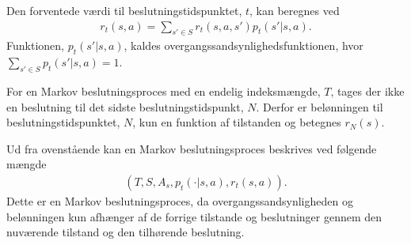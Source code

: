 Den forventede værdi til beslutningstidspunktet, $t$, kan beregnes ved 
\begin{align*}
    r_t(s,a)=\sum_{s'\in S} r_t(s,a,s')p_t(s' | s,a).
\end{align*}
%
%
%
%
Funktionen, $p_t(s'|s,a)$, kaldes overgangssandsynlighedsfunktionen, hvor $\displaystyle\sum_{s'\in S} p_t(s'|s,a)=1$.


For en Markov beslutningsproces med en endelig indeksmængde, $T$, tages der ikke en beslutning til det sidste beslutningstidspunkt, $N$. Derfor er belønningen til beslutningstidspunktet, $N$, kun en funktion af tilstanden og betegnes $r_N(s)$.

Ud fra ovenstående kan en Markov beslutningsproces beskrives ved følgende mængde
%
\begin{align*}
    \left(T, S, A_s, p_t(\cdot | s,a), r_t(s,a)\right).
 \end{align*}
Dette er en Markov beslutningsproces, da overgangssandsynligheden og belønningen kun afhænger af de forrige tilstande og beslutninger gennem den nuværende tilstand og den tilhørende beslutning. 




